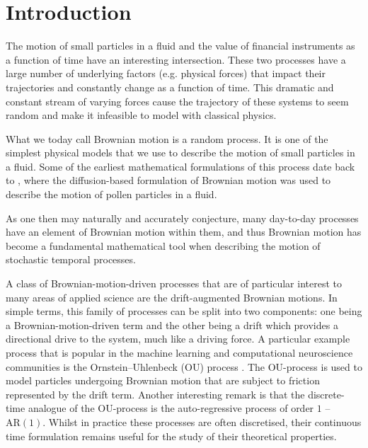\documentclass[a4paper,12pt,twoside,openright]{report}
\theoremstyle{definition}
\begin{document}
\pagestyle{empty}
\singlespacing

\onehalfspacing

\singlespacing


\setcounter{page}{0}
\pagestyle{plain}
\tableofcontents
\listoffigures
\listoftables

\onehalfspacing


 \chapter{Introduction}
 
 The motion of small particles in a fluid and the value of financial instruments as a function of time have an interesting intersection. These two processes have a large number of underlying factors (e.g. physical forces) that impact their trajectories and constantly change as a function of time. This dramatic and constant stream of varying forces cause the trajectory of these systems to seem random and make it infeasible  to model with classical physics. 
 
 What we today call Brownian motion is a random process. It is one of the simplest physical models that we use to describe the motion of small particles in a fluid. Some of the earliest mathematical formulations of this process date back to \cite{einstein1905motion}, where the diffusion-based formulation of Brownian motion was used to describe the motion of pollen particles in a fluid.
 
 As one then may naturally and accurately conjecture, many day-to-day processes have an element of Brownian motion within them, and thus Brownian motion has become a fundamental mathematical tool when describing the motion of stochastic temporal processes.
 
 A class of Brownian-motion-driven processes that are of particular interest to many areas of applied science are the drift-augmented Brownian motions. In simple terms, this family of processes can be split into two components: one being a Brownian-motion-driven term and the other being a drift which provides a directional drive to the system, much like a driving force.  A particular example process that is popular in the machine learning and computational neuroscience communities is the Ornstein–Uhlenbeck (OU) process \citep{doob1942brownian}. The OU-process is used to model particles undergoing Brownian motion that are subject to friction represented by the drift term. Another interesting remark is that the discrete-time analogue of the OU-process is the auto-regressive process of order $1$ -- $\text{AR}(1)$. Whilst in practice these processes are often discretised, their continuous time formulation remains useful for the study of their theoretical properties.
 
\end{document}
